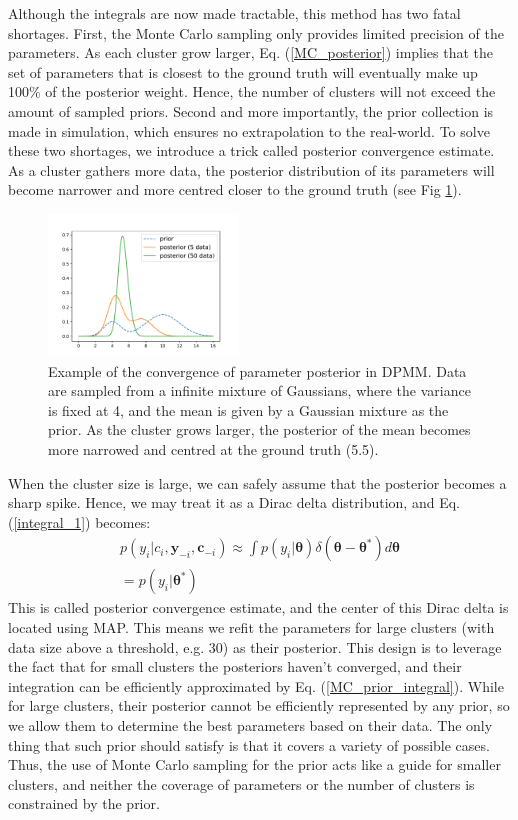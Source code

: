 \documentclass[journal]{IEEEtran}
\begin{document}
Although the integrals are now made tractable, this method has two fatal shortages.
First, the Monte Carlo sampling only provides limited precision of the parameters.
As each cluster grow larger, Eq. (\ref{MC_posterior}) implies that the set of parameters that is closest to the ground truth will eventually make up 100\% of the posterior weight.
Hence, the number of clusters will not exceed the amount of sampled priors. 
Second and more importantly, the prior collection is made in simulation, which ensures no extrapolation to the real-world.
To solve these two shortages, we introduce a trick called posterior convergence estimate.
As a cluster gathers more data, the posterior distribution of its parameters will become narrower and more centred closer to the ground truth (see Fig \ref{posterior_convergence}).
\begin{figure}[h]
\centering
\includegraphics[width=0.45\textwidth]{posterior_convergence.pdf}
\caption{Example of the convergence of parameter posterior in DPMM.
Data are sampled from a infinite mixture of Gaussians, where the variance is fixed at 4, and the mean is given by a Gaussian mixture as the prior.
As the cluster grows larger, the posterior of the mean becomes more narrowed and centred at the ground truth (5.5).
}
\label{posterior_convergence}
\end{figure}
%
When the cluster size is large, we can safely assume that the posterior becomes a sharp spike.
Hence, we may treat it as a Dirac delta distribution, and Eq. (\ref{integral_1}) becomes:
\begin{equation}
\begin{gathered}
p(y_i|c_i, \bm{y}_{-i}, \bm{c}_{-i}) \approx 
\int p(y_i|\bm{\theta})
\delta (\bm{\theta} - \bm{\theta}^*)
d\bm{\theta}
\\
= p(y_i|\bm{\theta}^*)
\end{gathered}
\label{posterior_convergence_estimate}
\end{equation}
This is called posterior convergence estimate, and the center of this Dirac delta is located using MAP. 
This means we refit the parameters for large clusters (with data size above a threshold, e.g. 30) as their posterior.
This design is to leverage the fact that for small clusters the posteriors haven't converged, and their integration can be efficiently approximated by Eq. (\ref{MC_prior_integral}).
While for large clusters, their posterior cannot be efficiently represented by any prior, so we allow them to determine the best parameters based on their data.
The only thing that such prior should satisfy is that it covers a variety of possible cases.
Thus, the use of Monte Carlo sampling for the prior acts like a guide for smaller clusters, and neither the coverage of parameters or the number of clusters is constrained by the prior. 
\end{document}
